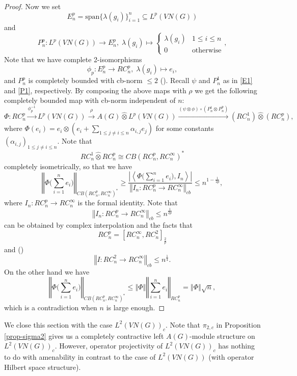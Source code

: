 \documentclass[10pt]{amsart}
\numberwithin{thm}{section}
\numberwithin{equation}{section}
\begin{document}
\begin{proof}
Now we set
	$$E^p_n = \text{span}\{\lambda(g_i)\}^n_{i=1} \subseteq L^p(VN(G))$$
and
	$$P^p_n : L^p(VN(G)) \rightarrow E^p_n,\;\lambda(g_i) \mapsto
	\left\{ \begin{array}{ll} \lambda(g_i) & 1\le i\le n\\ 0 & \text{otherwise} \end{array}\right.,$$
Note that we have complete 2-isomorphisms
	$$\phi_p : E^p_n \rightarrow RC^p_n,\; \lambda(g_i) \mapsto e_i,$$
and $P^p_n$ is completely bounded with cb-norm $\le 2$ (\cite[section 9.7]{P03}).
Recall $\psi$ and $P^1_n$ as in \eqref{E1} and \eqref{P1}, respectively.
By composing the above maps with $\rho$ we get the following completely bounded map with cb-norm independent of $n$: 
	$$\Phi : RC^p_n \stackrel{\phi^{-1}_p}{\longrightarrow} L^p(VN(G)) \stackrel{\rho}{\longrightarrow} A(G) {\widehat{\otimes}} L^p(VN(G))
	\stackrel{(\psi \otimes \phi)\circ (P^1_n\otimes P^p_n)}{\longrightarrow} (RC^1_n) {\widehat{\otimes}} (RC^p_n),$$
where $\Phi(e_i) = e_i \otimes (e_i + \sum_{1\le j\neq i\le n}\alpha_{i,j}e_j)$ for some constants $(\alpha_{i,j})_{1\le j\neq i\le n}$.
Note that
	$$RC^1_n {\widehat{\otimes}} RC^p_n \cong CB(RC^p_n, RC^\infty_n)^*$$
completely isometrically, so that we have
	$${\left\Vert{\Phi \Big(\sum^n_{i=1}e_i\Big)}\right\Vert}_{CB(RC^p_n, RC^\infty_n)^*}
	\ge \frac{{\left\vert{\left\langle \Phi\Big(\sum^n_{i=1}e_i\Big), I_n \right\rangle}\right\vert}}{{\left\Vert{I_n : RC^p_n \rightarrow RC^\infty_n}\right\Vert}_{cb}}
	\le n^{1-\frac{1}{2p}},$$
where $I_n : RC^p_n \rightarrow RC^\infty_n$ is the formal identity.
Note that
	$${\left\Vert{I_n : RC^p_n \rightarrow RC^\infty_n}\right\Vert}_{cb} \le n^{\frac{1}{2p}}$$
can be obtained by complex interpolation and the facts that
	$$RC^p_n = [RC^\infty_n, RC^2_n]_{\frac{2}{p}}$$
and (\cite[section 10]{P03})
	$${\left\Vert{I : RC^2_n \rightarrow RC^\infty_n}\right\Vert}_{cb} \le n^{\frac{1}{4}}.$$
On the other hand we have
	$${\left\Vert{\Phi \Big(\sum^n_{i=1}e_i\Big)}\right\Vert}_{CB(RC^p_n, RC^\infty_n)^*} \le {\left\Vert{\Phi}\right\Vert} {\left\Vert{\sum^n_{i=1}e_i}\right\Vert}_{RC^p_n} = {\left\Vert{\Phi}\right\Vert}\sqrt{n},$$
which is a contradiction when $n$ is large enough.

\end{proof}

We close this section with the case $L^2(VN(G))_c$.
Note that $\pi_{2,c}$ in Proposition \ref{prop-sigma2} gives us a completely contractive left $A(G)$-module structure on $L^2(VN(G))_c$.
However, operator projectivity of $L^2(VN(G))_c$ has nothing to do with amenability
in contrast to the case of $L^2(VN(G))$ (with operator Hilbert space structure).
\end{document}
